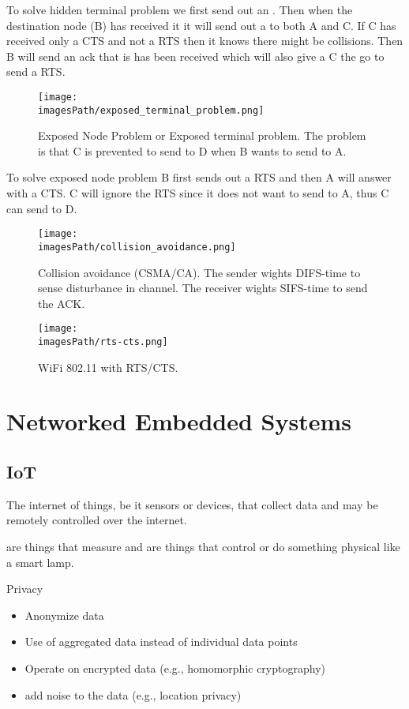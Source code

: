 To solve hidden terminal problem we first send out an . Then 
when the destination node (B) has received it it will send out a  
to both A and C. If C has received only a CTS and not a RTS then it knows there might be collisions.
Then B will send an ack that is has been received which will also give a C the go to send a RTS.

\begin{figure}[H]
    \centering
    \texttt{[image: \\imagesPath/exposed\_terminal\_problem.png]}
    \caption{Exposed Node Problem or Exposed terminal problem. The problem is that C is prevented to send to D when B wants to send to A.}
\end{figure}

To solve exposed node problem B first sends out a RTS and then A will answer with a CTS. 
C will ignore the RTS since it does not want to send to A, thus C can send to D.

\begin{figure}[H]
    \centering
    \texttt{[image: \\imagesPath/collision\_avoidance.png]}
    \caption{Collision avoidance (CSMA/CA). The sender wights DIFS-time to sense disturbance in channel. 
    The receiver wights SIFS-time to send the ACK.}
\end{figure}

\begin{figure}[H]
    \centering
    \texttt{[image: \\imagesPath/rts-cts.png]}
    \caption{WiFi 802.11 with RTS/CTS.}
\end{figure}



\section{Networked Embedded Systems}

\subsection{IoT}
The internet of things, be it sensors or devices, that collect data and may be 
remotely controlled over the internet.

 are things that measure and  are things that 
control or do something physical like a smart lamp.

Privacy
\begin{itemize}
    \item Anonymize data
    \item Use of aggregated data instead of individual data points
    \item Operate on encrypted data (e.g., homomorphic cryptography)
    \item add noise to the data (e.g., location privacy)
\end{itemize}

